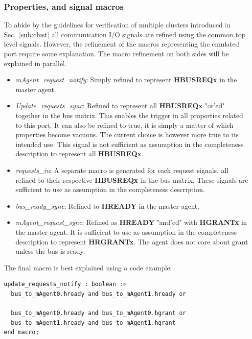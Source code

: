 \subsubsection{Properties, and signal macros}
To abide by the guidelines for verification of multiple clusters introduced in Sec.~\ref{sub:clust} all communication I/O signals are refined using the common
top level signals. However, the refinement of the macros representing the emulated port require some explanation. The macro refinement on both sides will be explained in parallel. 
\begin{itemize}
 \item \textit{mAgent\_request\_notify}: Simply refined to represent \textbf{HBUSREQx} in the master agent.
 \item \textit{Update\_requests\_sync}: Refined to represent all \textbf{HBUSREQx} "or'ed" together in the bus matrix. This enables the trigger in all properties related to this port. It can also be refined to true, it is simply a matter of which properties become vacuous. The current choice is however more true to its intended use. This signal is not sufficient as assumption in the completeness description to represent all \textbf{HBUSREQx}.
 \item \textit{requests\_in}: A separate macro is generated for each request signals, all refined to their respective \textbf{HBUSREQx} in the bus matrix. These signals are sufficient to use as assumption in the completeness description.  
 \item \textit{bus\_ready\_sync}: Refined to \textbf{HREADY} in the master agent. 
 \item \textit{mAgent\_request\_sync}: Refined as \textbf{HREADY} "and'ed" with \textbf{HGRANTx} in the master agent. It is sufficient to use as assumption in the completeness description to represent \textbf{HRGRANTx}. The agent does not care about grant unless the bus is ready. 
\end{itemize} 

The final macro is best explained using a code example:\\
\begin{lstlisting}
update_requests_notify : boolean := 
  bus_to_mAgent0.hready and bus_to_mAgent1.hready or
  
  bus_to_mAgent0.hready and bus_to_mAgent0.hgrant or
  bus_to_mAgent1.hready and bus_to_mAgent1.hgrant
end macro;
\end{lstlisting}

